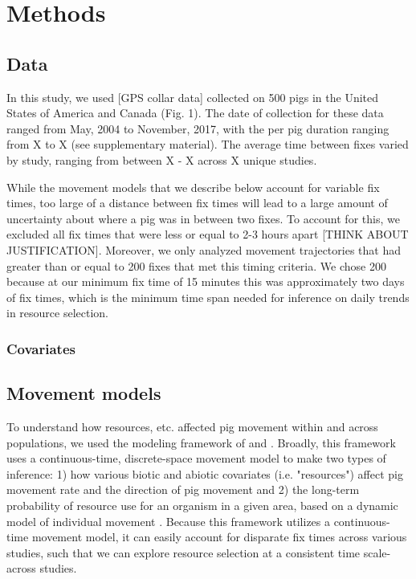 \documentclass[a4paper]{article}
\begin{document}
\section*{Methods}

\subsection*{Data}

In this study, we used [GPS collar data] collected on 500 pigs in the United States of America and Canada (Fig. 1). The date of collection for these data ranged from May, 2004 to November, 2017, with the per pig duration ranging from X to X (see supplementary material). The average time between fixes varied by study, ranging from between X - X across X unique studies. 

While the movement models that we describe below account for variable fix times, too large of a distance between fix times will lead to a large amount of uncertainty about where a pig was in between two fixes. To account for this, we excluded all fix times that were less or equal to 2-3 hours apart [THINK ABOUT JUSTIFICATION]. Moreover, we only analyzed movement trajectories that had greater than or equal to 200 fixes that met this timing criteria. We chose 200 because at our minimum fix time of 15 minutes this was approximately two days of fix times, which is the minimum time span needed for inference on daily trends in resource selection. 

\subsubsection*{Covariates}

\subsection*{Movement models}

To understand how resources, etc. affected pig movement within and across populations, we used the modeling framework of \cite{Hanks2015} and \cite{Wilson2018}. Broadly, this framework uses a continuous-time, discrete-space movement model to make two types of inference: 1) how various biotic and abiotic covariates (i.e. "resources") affect pig movement rate and the direction of pig movement \citep{Hanks2015} and 2) the long-term probability of resource use for an organism in a given area, based on a dynamic model of individual movement \citep{Wilson2018}.  Because this framework utilizes a continuous-time movement model, it can easily account for disparate fix times across various studies, such that we can explore resource selection at a consistent time scale-across studies.
\end{document}
